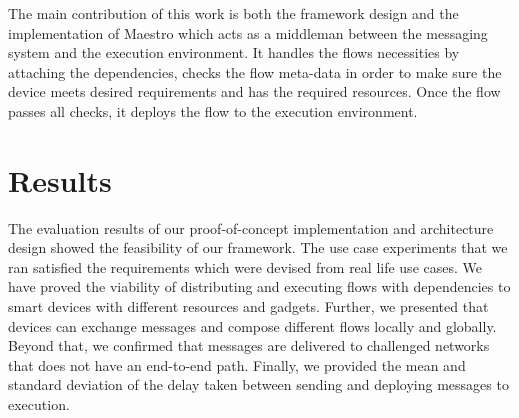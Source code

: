 \noindent The main contribution of this work is both the framework design and the implementation of Maestro which acts as a middleman between the messaging system and the execution environment. It handles the flows necessities by attaching the dependencies, checks the flow meta-data in order to make sure the device meets desired requirements and has the required resources. Once the flow passes all checks, it deploys the flow to the execution environment.


\section{Results}
The evaluation results of our  proof-of-concept implementation and architecture design showed the feasibility of our framework. The use case experiments that we ran satisfied the  requirements which were devised from  real life use cases. We have proved the viability of distributing and executing flows with dependencies to smart devices with different resources and gadgets. Further, we presented that devices can exchange messages and compose different flows locally and globally. Beyond that, we confirmed that messages are delivered to challenged networks that does not have an end-to-end path. Finally, we provided the mean and standard deviation of the delay taken between sending and deploying messages to execution. 




